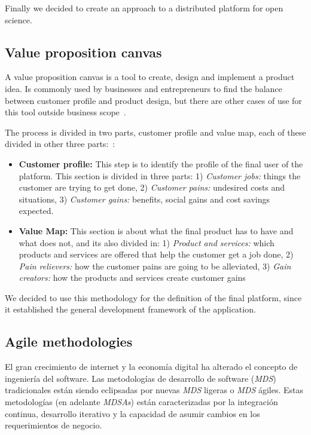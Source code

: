 Finally we decided to create an approach to a distributed platform for open
science.

\subsection{Value proposition canvas}


A value proposition canvas is a tool to create, design and implement a product
idea. Is commonly used by businesses and entrepreneurs to find the balance
between customer profile and product design, but there are other cases of use
for this tool outside business
scope~\cite{pokorna2015value,meertens2012mapping}.

The process is divided in two parts, customer profile and value map, each of
these divided in other three parts:~\cite{osterwalder2014value}:

\begin{itemize}
\item \textbf{Customer profile:} This step is to identify the profile of the
  final user of the platform. This section is divided in three parts: 1)
  \emph{Customer jobs:} things the customer are trying to get done, 2)
  \emph{Customer pains:} undesired costs and situations, 3) \emph{Customer
    gains:} benefits, social gains and cost savings expected.
\item \textbf{Value Map:} This section is about what the final product has to
  have and what does not, and its also divided in: 1) \emph{Product and
    services:} which products and services are offered that help the customer
  get a job done, 2) \emph{Pain relievers:} how the customer pains are going to
  be alleviated, 3) \emph{Gain creators:} how the products and services create
  customer gains
\end{itemize}

We decided to use this methodology for the definition of the final platform,
since it established the general development framework of the application.

\subsection{Agile methodologies} 

El gran crecimiento de internet y la economía digital ha alterado el concepto de
ingeniería del software. Las metodologías de desarrollo de software (\emph{MDS})
tradicionales están siendo eclipsadas por nuevas \emph{MDS} ligeras o \emph{MDS}
ágiles. Estas metodologías (en adelante \emph{MDSAs}) están caracterizadas por
la integración continua, desarrollo iterativo y la capacidad de asumir cambios
en los requerimientos de
negocio.\cite{boehm2005management,livermore2008factors}

